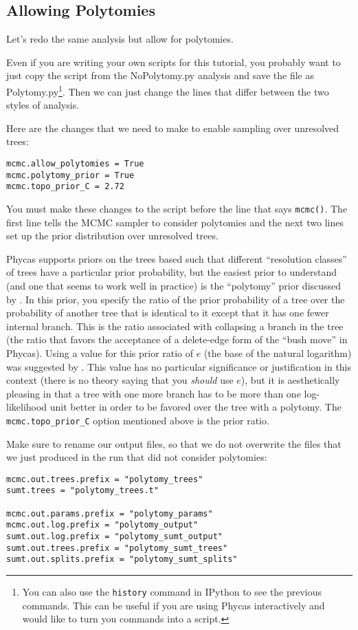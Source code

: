 \documentclass{article}
\newcommand{\cmd}[1]{\texttt{#1}\xspace}
\newcommand{\phycas}{Phycas\xspace}
\newcommand{\localfile}[1]{\textsf{#1}\xspace}
\begin{document}
\subsection{Allowing Polytomies}
Let's redo the same analysis but allow for polytomies.

Even if you are writing your own scripts for this tutorial, you probably 
want to just copy the script from the \localfile{NoPolytomy.py} analysis and save
the file as \localfile{Polytomy.py}\footnote{You can also use the \cmd{history} command in IPython to see the previous commands. This can be useful if you are using \phycas interactively and would
like to turn you commands into a script.}.
Then we can just change the lines that differ between the two styles of analysis.

Here are the changes that we need to make to enable sampling over unresolved trees:
\begin{verbatim}
mcmc.allow_polytomies = True
mcmc.polytomy_prior = True
mcmc.topo_prior_C = 2.72
\end{verbatim}
You must make these changes to the script before the line that says \cmd{mcmc()}.
The first line tells the MCMC sampler to consider polytomies and the next  two lines
set up the prior distribution over unresolved trees.

\phycas supports priors on the trees based such that different ``resolution classes'' of trees have a particular prior probability, but the easiest prior to understand (and one that seems to work well in practice) is the ``polytomy'' prior discussed by \citet{LewisHolderHolsinger2005}.
In this prior, you specify the ratio of the prior probability of a tree over the probability of another tree that is identical to it except  that it has one fewer internal branch.
This is the ratio associated with collapsing a branch in the tree (the ratio that favors the 
acceptance of a delete-edge form of the ``bush move'' in \phycas).
Using a value for this prior ratio of $e$ (the base of the natural logarithm) was 
suggested by \citet{LewisHolderHolsinger2005}.
This value has no particular significance or justification in this
context (there is no theory saying that you {\em should} use $e$),
but it is aesthetically pleasing in that a tree with one more
branch has to be more than one log-likelihood unit better in
order to be favored over the tree with a polytomy.
The \cmd{mcmc.topo\_prior\_C} option mentioned above is the prior ratio.


Make sure to rename our output files, so that we do not overwrite the files that we just produced
in the run that did not consider polytomies:
\begin{verbatim}
mcmc.out.trees.prefix = "polytomy_trees"
sumt.trees = "polytomy_trees.t"

mcmc.out.params.prefix = "polytomy_params"
mcmc.out.log.prefix = "polytomy_output"
sumt.out.log.prefix = "polytomy_sumt_output"
sumt.out.trees.prefix = "polytomy_sumt_trees"
sumt.out.splits.prefix = "polytomy_sumt_splits"
\end{verbatim}
\end{document}
